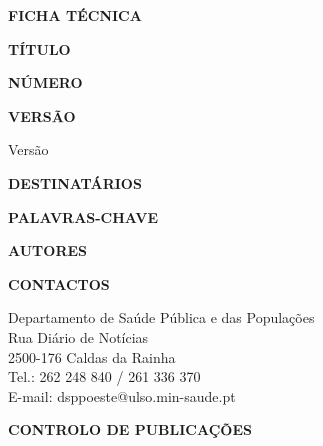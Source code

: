 \documentclass[a4paper,11pt]{report}
\newenvironment{fichatecnica}{%
  \clearpage
  \thispagestyle{fancy}
  \vspace*{-0.5cm}
  {\Large\bfseries\color{procegreen}FICHA TÉCNICA\par}
  \vspace{1cm}
}{%
  \clearpage
}
\begin{document}

\pagestyle{fancy}  %


\begin{fichatecnica}
{\large\bfseries TÍTULO\par}
\procedimentoTitulo
\vspace{0.5cm}

{\large\bfseries NÚMERO\par}
\procedimentoNumero
\vspace{0.5cm}

{\large\bfseries VERSÃO\par}
Versão \procedimentoVersao
\vspace{0.5cm}

{\large\bfseries DESTINATÁRIOS\par}
\procedimentoDestinatarios
\vspace{0.5cm}

{\large\bfseries PALAVRAS-CHAVE\par}
\procedimentoPalavrasChave
\vspace{0.5cm}

{\large\bfseries AUTORES\par}
\listarAutores
\vspace{0.5cm}

{\large\bfseries CONTACTOS\par}
Departamento de Saúde Pública e das Populações\\
Rua Diário de Notícias\\
2500-176 Caldas da Rainha\\
Tel.: 262 248 840 / 261 336 370\\
E-mail: dsppoeste@ulso.min-saude.pt\\
\vspace{0.5cm}

{\large\bfseries CONTROLO DE PUBLICAÇÕES\par}
\vspace{0.3cm}
\begin{center}
\tabelaControloVersao
\end{center}
\end{fichatecnica}
\end{document}
